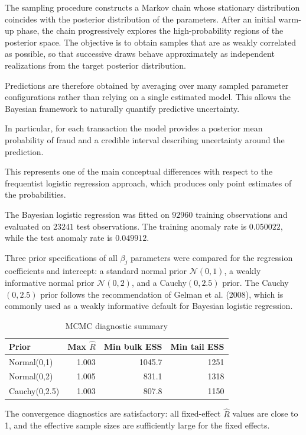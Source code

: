 \documentclass[a4paper,12pt]{article}
\begin{document}
The sampling procedure constructs a Markov chain whose stationary distribution coincides with the posterior distribution of the parameters. After an initial warm-up phase, the chain progressively explores the high-probability regions of the posterior space. The objective is to obtain samples that are as weakly correlated as possible, so that successive draws behave approximately as independent realizations from the target posterior distribution.

Predictions are therefore obtained by averaging over many sampled parameter configurations rather than relying on a single estimated model. This allows the Bayesian framework to naturally quantify predictive uncertainty.

In particular, for each transaction the model provides a posterior mean probability of fraud and a credible interval describing uncertainty around the prediction.

This represents one of the main conceptual differences with respect to the frequentist logistic regression approach, which produces only point estimates of the probabilities.

The Bayesian logistic regression was fitted on $92960$ training observations and evaluated on $23241$ test observations. The training anomaly rate is $0.050022$, while the test anomaly rate is $0.049912$.

Three prior specifications of all $\beta_j$ parameters were compared for the regression coefficients and intercept: a standard normal prior $\mathcal{N}(0,1)$, a weakly informative normal prior $\mathcal{N}(0,2)$, and a Cauchy$(0,2.5)$ prior. The Cauchy$(0,2.5)$ prior follows the recommendation of Gelman et al. (2008), which is commonly used as a weakly informative default for Bayesian logistic regression.

\begin{table}[H]
\centering
\begin{tabular}{lrrr}
\toprule
\textbf{Prior} & \textbf{Max $\hat{R}$} & \textbf{Min bulk ESS} & \textbf{Min tail ESS} \\
\midrule
Normal(0,1) & 1.003 & 1045.7 & 1251 \\
Normal(0,2) & 1.005 & 831.1 & 1318 \\
Cauchy(0,2.5) & 1.003 & 807.8 & 1150 \\
\bottomrule
\end{tabular}
\caption{MCMC diagnostic summary}
\end{table}

The convergence diagnostics are satisfactory: all fixed-effect $\hat{R}$ values are close to 1, and the effective sample sizes are sufficiently large for the fixed effects.
\end{document}
